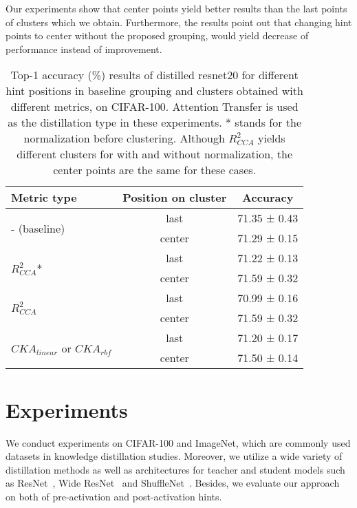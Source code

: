 \documentclass[final,3p,times]{elsarticle}
\begin{document}
Our experiments show that center points yield better results than the last points of clusters which we obtain. Furthermore, the results point out that changing hint points to center without the proposed grouping, would yield decrease of performance instead of improvement.

\begin{table}[h]
\centering
\caption{Top-1 accuracy (\%) results of distilled resnet20 for different hint positions in baseline grouping and clusters obtained with different metrics, on CIFAR-100. Attention Transfer is used  as the distillation type in these experiments. * stands for the normalization before clustering. Although $R^2_{CCA}$ yields different clusters for with and without normalization, the center points are the same for these cases.\\}
\label{tab:AT_all_metrics}

\begin{tabular}{l|c|c}

{Metric type} & {Position on cluster} & {Accuracy}     \\ \hline\hline
\multirow{2}{*}{- (baseline)} & last & 71.35 ± 0.43 \\ %
& center & 71.29 ± 0.15 \\ \hline

\multirow{2}{*}{$R^2_{CCA}$*} & last & 71.22 ± 0.13 \\ 
 & center & 71.59 ± 0.32 \\ \hline
 
\multirow{2}{*}{$R^2_{CCA}$}  & last & 70.99 ± 0.16 \\ 
 & center & 71.59 ± 0.32\\ \hline
 
\multirow{2}{*}{$CKA_{linear}$ or $CKA_{rbf}$}& last & 71.20 ± 0.17 \\ 
 & center & 71.50 ± 0.14\\ \hline

\end{tabular}
\end{table}

\section{Experiments}
\label{sec:experiments} 

We conduct experiments on CIFAR-100 and ImageNet, which are commonly used datasets in knowledge distillation studies. Moreover, we utilize a wide variety of distillation methods as well as architectures for teacher and student models such as ResNet~\citep{resnet}, Wide ResNet~\citep{zagoruyko2016wide} and ShuffleNet~\citep{zhang2018shufflenet}. Besides, we evaluate our approach on both of pre-activation and post-activation hints.
\end{document}
